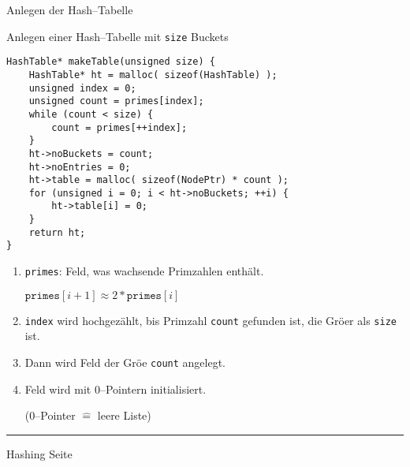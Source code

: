 \begin{slide}{}
\normalsize

\begin{center}
Anlegen der Hash--Tabelle
\end{center}
\vspace*{0.5cm}

\footnotesize
Anlegen einer Hash--Tabelle mit \texttt{size} Buckets
\begin{verbatim}
HashTable* makeTable(unsigned size) {
    HashTable* ht = malloc( sizeof(HashTable) );
    unsigned index = 0;
    unsigned count = primes[index];
    while (count < size) {
        count = primes[++index];
    }
    ht->noBuckets = count;
    ht->noEntries = 0;
    ht->table = malloc( sizeof(NodePtr) * count );
    for (unsigned i = 0; i < ht->noBuckets; ++i) {
        ht->table[i] = 0;
    }
    return ht;
}
\end{verbatim}
\begin{enumerate}
\item \texttt{primes}: Feld, was wachsende Primzahlen enth\"alt.

      $\mathtt{primes}[i+1] \approx 2 * \mathtt{primes}[i]$
\item \texttt{index} wird hochgez\"ahlt, bis Primzahl \texttt{count} gefunden ist,
      die Gr\"o\3er als \texttt{size} ist.
\item Dann wird Feld der Gr\"o\3e \texttt{count} angelegt.
\item Feld wird mit 0--Pointern initialisiert.

      (0--Pointer $\widehat{=}$ leere Liste)
\end{enumerate}


\vspace*{\fill}
\tiny \addtocounter{mypage}{1}
\rule{17cm}{1mm}
Hashing  \hspace*{\fill} Seite 
\end{slide}


